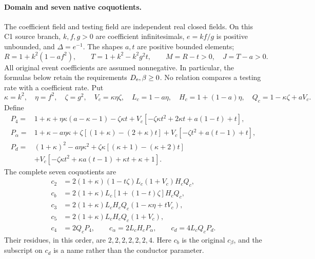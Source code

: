 \paragraph{Domain and seven native coquotients.}
The coefficient field and testing field are independent real closed
fields. On this C1 source branch, $k,f,g>0$ are coefficient
infinitesimals, $e=kf/g$ is positive unbounded, and
$\Delta=e^{-1}$. The shapes $a,t$ are positive bounded elements;
\[
 R=1+k^2(1-af^2),\qquad T=1+k^2-k^2g^2t,
 \qquad M=R-t>0,\quad J=T-a>0.
\]
All original event coefficients are assumed nonnegative. In particular,
the formulas below retain the requirements $D_{\rm e},\beta\ge0$.
No relation compares a testing rate with a coefficient rate.
Put
\[
 \kappa=k^2,\quad \eta=f^2,\quad \zeta=g^2,
 \quad V_c=\kappa\eta\zeta,\quad
 L_c=1-a\eta,\quad H_c=1+(1-a)\eta,\quad Q_c=1-\kappa\zeta+aV_c.
\]
Define
\begin{align*}
P_4={}&1+\kappa+\eta\kappa(a-\kappa-1)-\zeta\kappa t
 +V_c[-\zeta\kappa t^2+2\kappa t+a(1-t)+t],\\
P_\alpha={}&1+\kappa-a\eta\kappa
 +\zeta[(1+\kappa)-(2+\kappa)t]
 +V_c[-\zeta t^2+a(t-1)+t],\\
P_d={}&(1+\kappa)^2-a\eta\kappa^2
 +\zeta\kappa[(\kappa+1)-(\kappa+2)t]\\
 &+V_c[-\zeta\kappa t^2+\kappa a(t-1)+\kappa t+\kappa+1].
\end{align*}
The complete seven coquotients are
\begin{align*}
c_2&=2(1+\kappa)(1-t\zeta)L_c(1+V_c)H_cQ_c,\\
c_b&=2(1+\kappa)L_c[1+(1-t)\zeta]H_cQ_c,\\
c_3&=2(1+\kappa)L_cH_cQ_c(1-\kappa\eta+tV_c),\\
c_5&=2(1+\kappa)L_cH_cQ_c(1+V_c),\\
c_4&=2Q_cP_4,\qquad c_\alpha=2L_cH_cP_\alpha,
 \qquad c_d=4L_cQ_cP_d.
\end{align*}
Their residues, in this order, are $2,2,2,2,2,2,4$.
Here $c_b$ is the original $c_\beta$, and the subscript on $c_d$ is a
name rather than the conductor parameter.

